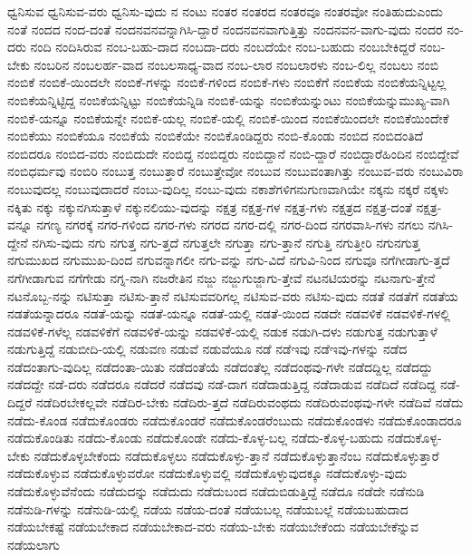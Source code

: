 {ಧ್ವನಿಸುವ
ಧ್ವನಿಸುವ-ವರು
ಧ್ವನಿಸು-ವುದು
ನ
ನಂಟು
ನಂತರ
ನಂತರದ
ನಂತರವೂ
ನಂತರವೋ
ನಂತಿಹುದುಎಂದು
ನಂತೆ
ನಂದದ
ನಂದ-ದಂತೆ
ನಂದನವನವನ್ನಾಗಿಸಿ-ದ್ದಾರೆ
ನಂದನವನವಾಗುತ್ತಿತ್ತು
ನಂದನವನ-ವಾಗು-ವುದು
ನಂದರ
ನಂ-ದರು
ನಂದಿ
ನಂದಿಸಿರುವ
ನಂಬ-ಬಹು-ದಾದ
ನಂಬದಾ-ದರು
ನಂಬದೆಯೇ
ನಂಬ-ಬಹುದು
ನಂಬಬೇಕಿದ್ದರೆ
ನಂಬ-ಬೇಕು
ನಂಬರಿನ
ನಂಬಲರ್ಹ-ವಾದ
ನಂಬಲಸಾಧ್ಯ-ವಾದ
ನಂಬ-ಲಾರ
ನಂಬಲಾರಳು
ನಂಬ-ಲಿಲ್ಲ
ನಂಬಲು
ನಂಬಿ
ನಂಬಿಕೆ
ನಂಬಿಕೆ-ಯಿಂದಲೇ
ನಂಬಿಕೆ-ಗಳನ್ನು
ನಂಬಿಕೆ-ಗಳಿಂದ
ನಂಬಿಕೆ-ಗಳು
ನಂಬಿಕೆಗೆ
ನಂಬಿಕೆಯ
ನಂಬಿಕೆಯನ್ನಿಟ್ಟಲ್ಲ
ನಂಬಿಕೆಯನ್ನಿಟ್ಟಿದ್ದ
ನಂಬಿಕೆಯನ್ನಿಟ್ಟು
ನಂಬಿಕೆಯನ್ನಿಡಿ
ನಂಬಿಕೆ-ಯನ್ನು
ನಂಬಿಕೆಯನ್ನುಂಟು
ನಂಬಿಕೆಯನ್ನುಮುಖ್ಯ-ವಾಗಿ
ನಂಬಿಕೆ-ಯನ್ನೂ
ನಂಬಿಕೆಯನ್ನೇ
ನಂಬಿಕೆ-ಯಲ್ಲ
ನಂಬಿಕೆ-ಯಲ್ಲಿ
ನಂಬಿಕೆ-ಯಿಂದ
ನಂಬಿಕೆಯಿಂದಲೇ
ನಂಬಿಕೆಯಿಂದೇಕೆ
ನಂಬಿಕೆಯು
ನಂಬಿಕೆಯೂ
ನಂಬಿಕೆಯೆ
ನಂಬಿಕೆಯೇ
ನಂಬಿಕೊಂಡಿದ್ದರು
ನಂಬಿ-ಕೊಂಡು
ನಂಬಿದ
ನಂಬಿದಂತಿದೆ
ನಂಬಿದರೂ
ನಂಬಿದ-ವರು
ನಂಬಿದುದೇ
ನಂಬಿದ್ದ
ನಂಬಿದ್ದರು
ನಂಬಿದ್ದಾನೆ
ನಂಬಿ-ದ್ದಾರೆ
ನಂಬಿದ್ದಾರೆಹಿಂದಿನ
ನಂಬಿದ್ದೇವೆ
ನಂಬಿಧರ್ಮವು
ನಂಬಿರಿ
ನಂಬುತ್ತ
ನಂಬುತ್ತಾರೆ
ನಂಬುತ್ತೇವೋ
ನಂಬುವ
ನಂಬುವಂತಾಗಿತ್ತು
ನಂಬುವ-ವರು
ನಂಬುವಿರಾ
ನಂಬುವುದಲ್ಲ
ನಂಬುವುದಾದರೆ
ನಂಬು-ವುದಿಲ್ಲ
ನಂಬು-ವುದು
ನಕಾಶೆಗಳಿಗನುಗುಣವಾಗಿಯೇ
ನಕ್ಕನು
ನಕ್ಕರೆ
ನಕ್ಕಳು
ನಕ್ಕಿತು
ನಕ್ಕು
ನಕ್ಕುನಗಿಸುತ್ತಾಳೆ
ನಕ್ಕುನಲಿಯು-ವುದನ್ನು
ನಕ್ಷತ್ರ
ನಕ್ಷತ್ರ-ಗಳ
ನಕ್ಷತ್ರ-ಗಳು
ನಕ್ಷತ್ರದ
ನಕ್ಷತ್ರ-ದಂತೆ
ನಕ್ಷತ್ರ-ವನ್ನೂ
ನಗಣ್ಯ
ನಗರಕ್ಕೆ
ನಗರ-ಗಳಿಂದ
ನಗರ-ಗಳು
ನಗರದ
ನಗರ-ದಲ್ಲಿ
ನಗರ-ದಿಂದ
ನಗರವಾಸಿ-ಗಳು
ನಗಲು
ನಗಿಸಿ-ದ್ದೇನೆ
ನಗಿಸು-ವುದು
ನಗು
ನಗುತ್ತ
ನಗು-ತ್ತದೆ
ನಗುತ್ತಲೇ
ನಗುತ್ತಾ
ನಗು-ತ್ತಾನೆ
ನಗುತ್ತಿ
ನಗುತ್ತೀರಿ
ನಗುನಗುತ್ತ
ನಗುಮುಖದ
ನಗುಮುಖ-ದಿಂದ
ನಗುವನ್ನಾಗಲೀ
ನಗು-ವನ್ನು
ನಗು-ವಿದೆ
ನಗುವಿ-ನಿಂದ
ನಗುವೂ
ನಗೆಗೀಡಾಗು-ತ್ತದೆ
ನಗೆಗೀಡಾಗುವ
ನಗೆಗೇಡು
ನಗ್ನ-ನಾಗಿ
ನಜರೇತಿನ
ನಜ್ಜು
ನಜ್ಜುಗುಜ್ಜಾಗು-ತ್ತೇವೆ
ನಟನಟಿಯರನ್ನು
ನಟನಾಗು-ತ್ತೇನೆ
ನಟನೊಬ್ಬ-ನನ್ನು
ನಟಿಸುತ್ತಾ
ನಟಿಸು-ತ್ತಾನೆ
ನಟಿಸುವವರಿಗಲ್ಲ
ನಟಿಸುವ-ವರು
ನಟಿಸು-ವುದು
ನಡತೆ
ನಡತೆಗೆ
ನಡತೆಯ
ನಡತೆಯನ್ನಾದರೂ
ನಡತೆ-ಯನ್ನು
ನಡತೆ-ಯನ್ನೂ
ನಡತೆ-ಯಲ್ಲಿ
ನಡತೆ-ಯಿಂದ
ನಡದೇ
ನಡವಳಿಕೆ
ನಡವಳಿಕೆ-ಗಳಲ್ಲಿ
ನಡವಳಿಕೆ-ಗಳೆಲ್ಲ
ನಡವಳಿಕೆಗೆ
ನಡವಳಿಕೆ-ಯನ್ನು
ನಡವಳಿಕೆ-ಯಲ್ಲಿ
ನಡುಕ
ನಡುಗಿ-ದಳು
ನಡುಗುತ್ತ
ನಡುಗುತ್ತಾಳೆ
ನಡುಗುತ್ತಿದ್ದೆ
ನಡುಬೀದಿ-ಯಲ್ಲಿ
ನಡುವಣ
ನಡುವೆ
ನಡುವೆಯೂ
ನಡೆ
ನಡೆಇವು
ನಡೆಇವು-ಗಳನ್ನು
ನಡೆದ
ನಡೆದಂತಾಗು-ವುದಿಲ್ಲ
ನಡೆದಂತಾ-ಯಿತು
ನಡೆದಂತೆಯೆ
ನಡೆದಂತೆಲ್ಲ
ನಡೆದಂಥವು-ಗಳೇ
ನಡೆದದ್ದಿಲ್ಲ
ನಡೆದದ್ದು
ನಡೆದದ್ದೇ
ನಡೆ-ದರು
ನಡೆದರೂ
ನಡೆದರೆ
ನಡೆದವು
ನಡೆ-ದಾಗ
ನಡೆದಾಡುತ್ತಿದ್ದ
ನಡೆದಾಡುವ
ನಡೆದಿದೆ
ನಡೆದಿದ್ದ
ನಡೆ-ದಿದ್ದರೆ
ನಡೆದಿರಬೇಕಲ್ಲವೇ
ನಡೆದಿರ-ಬೇಕು
ನಡೆದಿರು-ತ್ತದೆ
ನಡೆದಿರುವಂಥದು
ನಡೆದಿರುವಂಥವು-ಗಳೇ
ನಡೆದಿವೆ
ನಡೆದು
ನಡೆದು-ಕೊಂಡ
ನಡೆದುಕೊಂಡರು
ನಡೆದುಕೊಂಡರೆ
ನಡೆದುಕೊಂಡರೆಂಬುದು
ನಡೆದುಕೊಂಡಳು
ನಡೆದುಕೊಂಡಾದರೂ
ನಡೆದುಕೊಂಡಿತು
ನಡೆದು-ಕೊಂಡು
ನಡೆದುಕೊಂಡೇ
ನಡೆದು-ಕೊಳ್ಳ-ಬಲ್ಲ
ನಡೆದು-ಕೊಳ್ಳ-ಬಹುದು
ನಡೆದುಕೊಳ್ಳ-ಬೇಕು
ನಡೆದುಕೊಳ್ಳಬೇಕೆಂದು
ನಡೆದುಕೊಳ್ಳಲು
ನಡೆದುಕೊಳ್ಳು-ತ್ತಾನೆ
ನಡೆದುಕೊಳ್ಳುತ್ತಾನೆಂಬ
ನಡೆದುಕೊಳ್ಳುತ್ತಾರೆ
ನಡೆದುಕೊಳ್ಳುವ
ನಡೆದುಕೊಳ್ಳುವರೋ
ನಡೆದುಕೊಳ್ಳುವಲ್ಲಿ
ನಡೆದುಕೊಳ್ಳುವುದಕ್ಕೂ
ನಡೆದುಕೊಳ್ಳು-ವುದು
ನಡೆದುಕೊಳ್ಳುವೆನೆಂದು
ನಡೆದುದನ್ನು
ನಡೆದುದು
ನಡೆದುಬಂದ
ನಡೆದುಬಿಡುತ್ತಿದ್ದೆ
ನಡೆದೂ
ನಡೆದೇ
ನಡೆನುಡಿ
ನಡೆನುಡಿ-ಗಳನ್ನು
ನಡೆನುಡಿ-ಯಲ್ಲಿ
ನಡೆಯ
ನಡೆಯ-ದಂತೆ
ನಡೆಯಬಲ್ಲ
ನಡೆಯಬಲ್ಲೆ
ನಡೆಯಬಹುದಾದ
ನಡೆಯಬೇಕಷ್ಟೆ
ನಡೆಯಬೇಕಾದ
ನಡೆಯಬೇಕಾದ-ವರು
ನಡೆಯ-ಬೇಕು
ನಡೆಯಬೇಕೆಂದು
ನಡೆಯಬೇಕೆನ್ನುವ
ನಡೆಯಲಾಗು
}
